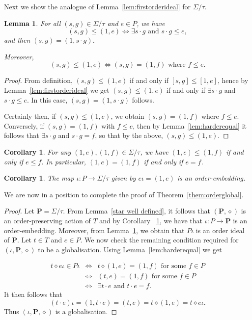 \documentclass[12pt]{amsart}
\newtheorem{lem}[them]{Lemma}
\newtheorem{cor}[them]{Corollary}
\theoremstyle{definition}
\theoremstyle{definition}
\numberwithin{them}{section}
\numberwithin{equation}{section}
\begin{document}
 Next we show the analogue of Lemma~\ref{lem:firstorderideal}  for $\Sigma/\tau$.
\begin{lem}\label{lem:secondorderideal}
For all $(s,g)\in \Sigma/\tau$ and $e \in P$, we have
\[(s,g)\leq (1,e)\Leftrightarrow \exists s\cdot g\mbox{ and }s\cdot g\leq e,\]
and then $(s,g)=(1,s\cdot g)$.

Moreover, 
\[(s,g)\leq (1,e)\Leftrightarrow (s,g)=(1,f)\mbox{ where }f\leq e.\]
\end{lem}
\begin{proof} 
From definition, $(s,g)\leq (1,e)$ if and only if $[s,g]\leq [1,e]$, hence by Lemma~\ref{lem:firstorderideal} we get $(s,g)\leq (1,e)$ if and only if $\exists s\cdot g$ and $s\cdot g\leq e$. In this case, $(s,g)=(1, s\cdot g)$ follows.

Certainly then, if $(s,g)\leq (1,e)$, we obtain  $(s,g)=(1,f)$ where $f\leq e$. Conversely, if $(s,g)=(1,f)$ with $f\leq e$, then by Lemma~\ref{lem:harderequal} it follows that $\exists s\cdot g$ and $s\cdot g=f$, so that by the above,  $(s,g)\leq (1,e)$.
\end{proof}

\begin{cor}\label{cor:vhardequal}  For any $(1,e), (1,f)\in \Sigma/\tau$,
we  have $(1,e)\leq (1,f)$ if and only if
$ e\leq f$. In particular, $(1,e)=(1,f)$ if and only if $ e= f$.
    \end{cor}


\begin{cor}\label{cor:iota} The map
$\iota:P\rightarrow \Sigma/\tau$ given by
$e\iota=(1,e)$ is an order-embedding. 
\end{cor}
 We are now in a position to complete the proof of Theorem~\ref{them:orderglobal}.
\begin{proof} 
Let  $\mathbf{P}=\Sigma/\tau$.  From  Lemma~\ref{star well defined}, it follows that $(\mathbf{P},\diamond)$ is an order-preserving action of $T$ and by Corollary ~\ref{cor:iota}, we have that  $\iota:P\rightarrow \mathbf{P}$  is an order-embedding. Moreover, from Lemma~\ref{lem:secondorderideal}, we obtain that $P\iota$ is an order ideal of $\mathbf{P}$. Let $t\in T$ and $e\in P$.  We now check the remaining condition required for $(\iota,\mathbf{P}, \diamond)$ to be a globalisation.  Using Lemma~\ref{lem:harderequal} we get

\[\begin{array}{rcl}
t\diamond e\iota\in P\iota&\Leftrightarrow&
t\diamond (1,e)=(1,f)\mbox{ for some }f\in P\\
&\Leftrightarrow&(t,e)=(1,f)\mbox{ for some }f\in P\\
&\Leftrightarrow& \exists t\cdot e\mbox{ and }t\cdot e=f.
    \end{array}\]
    It then follows that 
    \[(t\cdot e)\iota=(1, t\cdot e)= (t,e)=  t\diamond (1,e)=t\diamond e\iota.\]
  Thus $(\iota,\mathbf{P}, \diamond)$ is a globalisation.
 \end{proof}
\end{document}
